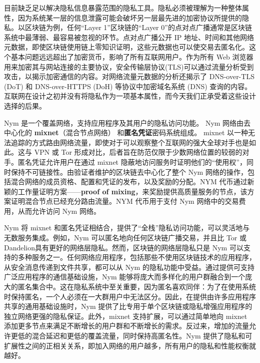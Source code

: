 \documentclass{article}
\begin{document}
	目前缺乏足以解决隐私信息暴露范围的隐私工具。隐私必须被理解为一种整体属性，因为系统某一层的信息泄露可能会破坏另一层最先进的加密协议所提供的隐私。以区块链为例，任何“Layer 1”区块链的“Layer 0”的点对点广播通常是区块链系统中最薄弱、最容易被忽视的环节。点对点广播公开 IP 地址、时间和其他网络元数据，即使区块链使用链上零知识证明\cite{ref6}，这些元数据也可以使交易去匿名化。这个基本问题远远超出了加密货币，影响了所有互联网用户。作为所有 Web 浏览器用来加密其与网站连接的主要协议，安全传输层协议(TLS)可以通过流量分析受到攻击，以揭示加密通信的内容\cite{ref21}。对网络流量元数据的分析还揭示了 DNS-over-TLS (DoT) 和 DNS-over-HTTPS (DoH) \cite{ref98} 等协议中加密域名系统 (DNS) 查询的内容。互联网在设计之初并没有将隐私作为一项基本属性，而今天我们正承受着这些设计选择的后果。\newline

	Nym 是一个覆盖网络，支持应用程序及其用户的隐私访问功能。 Nym 网络由去中心化的 \textbf{mixnet}（混合节点网络）\cite{ref89} 和\textbf{匿名凭证}密码系统\cite{ref101}组成。 mixnet 以一种无法追踪的方式路由网络流量，即使对于可以观察整个互联网的强大全球对手也是如此。这与 VPN 或 Tor 形成对比，后者旨在防范仅限于少数网络位置的较弱的对手。匿名凭证允许用户在通过 mixnet 隐蔽地访问服务时证明他们的“使用权”，同时保持不可链接性。由验证者维护的区块链去中心化了整个 Nym 网络的操作，包括混合网络的成员资格、配置和凭证的发布，以及奖励的分配。NYM 代币通过新颖的工作量证明方案——\textbf{proof of mixing}，来奖励提供高质量服务的节点，该方案证明混合节点已经充分路由流量。NYM 代币用于支付 Nym 网络中的交易费用，从而允许访问 Nym 网络。\newline

	Nym 将 mixnet 和匿名凭证相结合，提供了“全栈”隐私访问功能，可以灵活地与无数服务集成。例如，Nym 可以匿名地向任何区块链广播交易，并且比 Tor 或 Dandelion\cite{ref42, ref46}具有更好的网络层隐私。然而，区块链的网络层隐私只是 Nym 可以支持的多种服务之一。任何网络应用程序，包括那些不使用区块链技术的应用程序，从安全消息传递到文件共享，都可以从 Nym 的隐私功能中受益。通过提供可支持广泛应用程序的通信基础设施，Nym 能够将庞大而多样化的用户群融合到一个庞大的匿名集合中。这在隐私系统中至关重要，因为匿名喜欢同伴：为了在使用系统时保持匿名，一个人必须在一大群用户中无法区分\cite{ref41}。因此，在提供由许多应用程序共享的通用基础设施时，Nym 提供了比专用于单个区块链或隐私增强应用程序的独立网络更强的隐私保证。此外，mixnet 支持扩展，可以通过简单地向 mixnet 添加更多节点来满足不断增长的用户群和不断增长的需求。反过来，增加的流量允许更低的混合延迟和更低的覆盖流量，同时保持高匿名性。Nym 提供了隐私和可扩展性之间的正相关关系，即加入网络的用户越多，所有用户的隐私和性能权衡就越好。\newline
\end{document}
